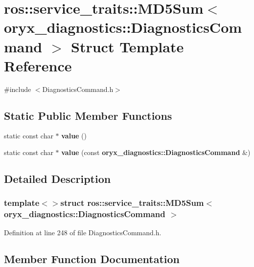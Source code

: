 \section{ros\-:\-:service\-\_\-traits\-:\-:\-M\-D5\-Sum$<$ oryx\-\_\-diagnostics\-:\-:\-Diagnostics\-Command $>$ \-Struct \-Template \-Reference}
\label{structros_1_1service__traits_1_1MD5Sum_3_01oryx__diagnostics_1_1DiagnosticsCommand_01_4}


{\ttfamily \#include $<$\-Diagnostics\-Command.\-h$>$}

\subsection*{\-Static \-Public \-Member \-Functions}
\begin{DoxyCompactItemize}
\item 
static const char $\ast$ {\bf value} ()
\item 
static const char $\ast$ {\bf value} (const {\bf oryx\-\_\-diagnostics\-::\-Diagnostics\-Command} \&)
\end{DoxyCompactItemize}


\subsection{\-Detailed \-Description}
\subsubsection*{template$<$$>$struct ros\-::service\-\_\-traits\-::\-M\-D5\-Sum$<$ oryx\-\_\-diagnostics\-::\-Diagnostics\-Command $>$}



\-Definition at line 248 of file \-Diagnostics\-Command.\-h.



\subsection{\-Member \-Function \-Documentation}
